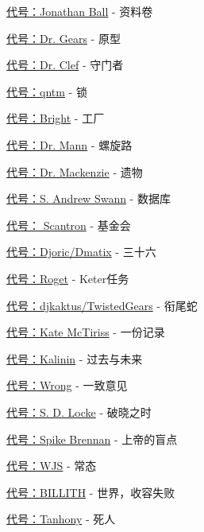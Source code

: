 
\hr

\begin{scpboxbrc}[colback=fcfdfb]

\hyperref[chap:SCP-001.sheaf.of.papers]{代号：Jonathan Ball} - 资料卷

\hyperref[chap:SCP-001.the.prototype]{代号：Dr. Gears} - 原型

\hyperref[chap:SCP-001.the.gate.guardian]{代号：Dr. Clef} - 守门者

\hyperref[chap:SCP-001.the.lock]{代号：qntm} - 锁

\hyperref[chap:SCP-001.the.factory]{代号：Bright} - 工厂

\hyperref[chap:SCP-001.the.spiral.path]{代号：Dr. Mann} - 螺旋路

\hyperref[chap:SCP-001.the.legacy]{代号：Dr. Mackenzie} - 遗物

\hyperref[chap:SCP-001.the.database]{代号：S. Andrew Swann} - 数据库

\hyperref[chap:SCP-001.the.foundation]{代号： Scantron} - 基金会

\hyperref[chap:SCP-001.thirty.six]{代号：Djoric/Dmatix} - 三十六

\hyperref[chap:SCP-001.keter.duty]{代号：Roget} - Keter任务

\hyperref[chap:SCP-001.ouroboros]{代号：djkaktus/TwistedGears} - 衔尾蛇

\hyperref[chap:SCP-001.a.record]{代号：Kate McTiriss} - 一份记录

\hyperref[chap:SCP-001.past.and.future]{代号：Kalinin} - 过去与未来

\hyperref[chap:SCP-001.the.consensus]{代号：Wrong} - 一致意见

\hyperref[chap:SCP-001.when.day.breaks]{代号：S. D. Locke} - 破晓之时

\hyperref[chap:SCP-001.gods.blind.spot]{代号：Spike Brennan} - 上帝的盲点

\hyperref[chap:SCP-001.normalcy]{代号：WJS} - 常态

\hyperref[chap:SCP-001.the.world.at.large]{代号：BILLITH} - 世界，收容失败

\hyperref[chap:SCP-001.dead.men]{代号：Tanhony} - 死人


\end{scpboxbrc}
